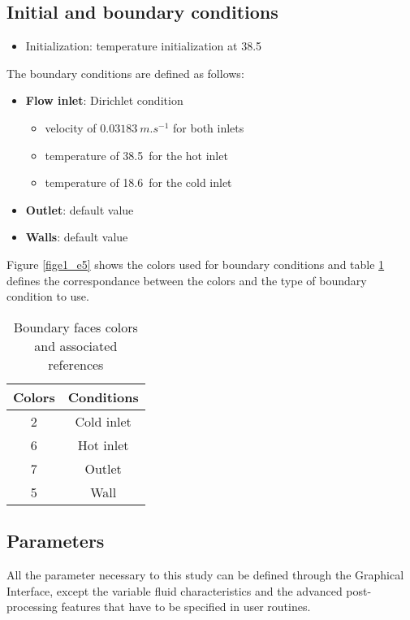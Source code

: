         \subsection{Initial and boundary conditions}

\begin{itemize}
\renewcommand{\labelitemi}{$\rightarrow$}
        \item Initialization: temperature initialization at 38.5\degresC
\end{itemize}

The boundary conditions are defined as follows:

\begin{itemize}
        \item {\bfseries Flow inlet}: Dirichlet condition
        \begin{itemize}
                \item velocity of $0.03183\ m.s^{-1}$ for both inlets
                \item temperature of 38.5\degresC\ for the hot inlet
                \item temperature of 18.6\degresC\ for the cold inlet
        \end{itemize}
        \item {\bfseries Outlet}: default value
        \item {\bfseries Walls}: default value
\end{itemize}

Figure \ref{fige1_e5} shows the colors used for boundary conditions and
table \ref{tabante51} defines the correspondance between the colors and
the type of boundary condition to use.

\begin{table}
\begin{center}
\begin{tabular}{|c|c|}
\hline
Colors & Conditions \\
\hline
2 & Cold inlet \\
\hline
6 & Hot inlet \\
\hline
7 & Outlet \\
\hline
5 & Wall \\
\hline
\end{tabular}
\caption{Boundary faces colors and associated references}
\label{tabante51}
\end{center}
\end{table}


        \subsection{Parameters}
All the parameter necessary to this study can be defined through the Graphical
Interface, except the variable fluid characteristics and the advanced
post-processing features that have to be specified in user routines.

